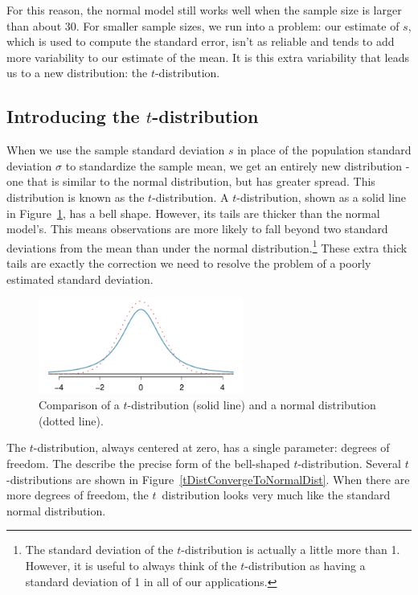 For this reason, the normal model still works well when the sample size is larger than about 30. For smaller sample sizes, we run into a problem: our estimate of $s$, which is used to compute the standard error, isn't as reliable and tends to add more variability to our estimate of the mean. It is this extra variability that leads us to a new distribution: the \mbox{$t$-distribution}.


\subsection{Introducing the $t$-distribution}
\label{introducingTheTDistribution}


When we use the sample standard deviation $s$ in place of the population standard deviation $\sigma$ to standardize the sample mean, we get an entirely new distribution - one that is similar to the normal distribution, but has greater spread. This distribution is known as the $t$-distribution. A $t$-distribution, shown as a solid line in Figure~\ref{tDistCompareToNormalDist}, has a bell shape. However, its tails are thicker than the normal model's. This means observations are more likely to fall beyond two standard deviations from the mean than under the normal distribution.\footnote{The standard deviation of the $t$-distribution is actually a little more than 1. However, it is useful to always think of the $t$-distribution as having a standard deviation of 1 in all of our applications.} These extra thick tails are exactly the correction we need to resolve the problem of a poorly estimated standard deviation.

\begin{figure}[h]
\centering
\includegraphics[width=0.6\textwidth]{ch_inference_for_means/figures/tDistCompareToNormalDist/tDistCompareToNormalDist}
\caption{Comparison of a $t$-distribution (solid line) and a normal distribution (dotted line).}
\label{tDistCompareToNormalDist}
\end{figure}

The $t$-distribution, always centered at zero, has a single parameter: degrees of freedom. The  describe the precise form of the bell-shaped $t$-distribution. Several $t$-distributions are shown in Figure~\ref{tDistConvergeToNormalDist}. When there are more degrees of freedom, the $t$~distribution looks very much like the standard normal distribution.

